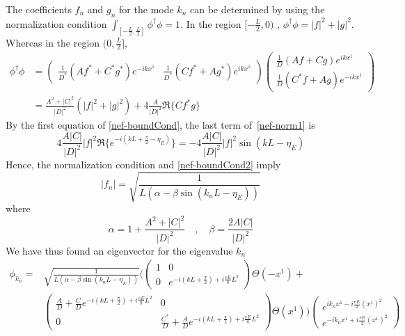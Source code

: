 The coefficients $f_{n}$ and $g_{n}$ for the mode $k_{ n}$ can be determined by using the normalization condition  $\int_{[-\frac{L}{2}, \frac{L}{2}]}\phi^\dagger \phi = 1$. 
In the region $[-\frac{L}{2}, 0)$ , $\phi^\dagger \phi = | f |^2 + | g |^2$. Whereas in the region $(0, \frac{L}{2}]$, 
\begin{equation}\label{nef-norm1}
\begin{split}
\phi^\dagger \phi & = \begin{pmatrix}
\frac{1}{D^*}(Af^* +  C^*g^*)e^{-ikx^1}  & \frac{1}{D^*}(C f^* + Ag^*)e^{ikx^1} 
\end{pmatrix}\begin{pmatrix}
\frac{1}{D}(Af +  Cg)e^{ikx^1}  \\
 \frac{1}{D}(C^* f + Ag)e^{-ikx^1} 
\end{pmatrix}  \\
 & =
\frac{A^2 + | C|^2}{| D |^2}(|f|^2 + |g|^2) + 4\frac{A}{|D|^2}\Re \{C f^* g\}
\end{split}
\end{equation}
By the first equation of \cref{nef-boundCond}, the last term of~\cref{nef-norm1} is 
\begin{equation*}
4\frac{A |C|}{|D|^2}| f|^2\Re\{e ^{-i(kL + \frac{\pi}{2} - \eta_E)}\} = 
- 4\frac{A |C|}{|D|^2}| f|^2\sin( kL - \eta_E) 
\end{equation*}
Hence, the normalization condition and \cref{nef-boundCond2} imply
\begin{equation*}
 | f_{n} | =  \sqrt{\frac{1}{L(\alpha - \beta \sin (k_{n} L - \eta_E))}}  
\end{equation*}
where 
\begin{equation*}
\alpha = 1+\frac{A^2 + |C|^2}{|D|^2} \quad,\quad
\beta = \frac{2 A |C|}{|D|^2}
\end{equation*}
We have thus found an eigenvector for the eigenvalue $k_n$
\begin{equation*} 
\begin{split}
\phi_{k_{n}} = 
& \sqrt{\frac{1}{L(\alpha - \beta \sin (k_{n}L - \eta_E))}} \Bigg( 
\begin{pmatrix}
1 & 0 \\
0  & e^{-i(kL + \frac{\pi}{2}) + i\frac{eE}{8}L^2}
\end{pmatrix}
\Theta(-x^1) + \\
& \begin{pmatrix}
\frac{A}{D}  +  \frac{C}{D} e^{-i(kL + \frac{\pi}{2})+ i\frac{eE}{8}L^2} & 0 \\
0  & \frac{C^*}{D}  + \frac{A}{D}e^{-i(kL + \frac{\pi}{2} ) + i\frac{eE}{8}L^2}
\end{pmatrix}\Theta(x^1)\Bigg)
\begin{pmatrix}
e^{ik_{n} x^1 -  i\frac{eE}{2}(x^1)^2} \\
e^{- ik_{n} x^1 + i\frac{eE}{2}(x^1)^2}
\end{pmatrix}
\end{split}
\end{equation*}
